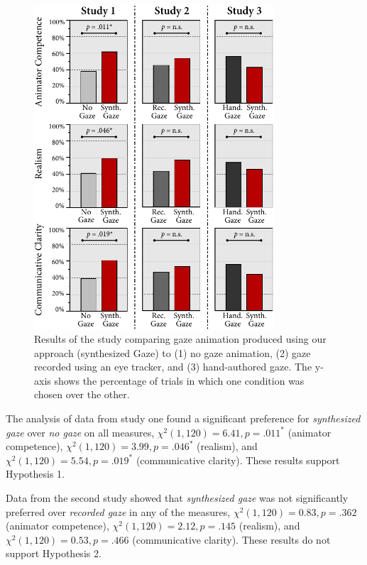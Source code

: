 \begin{figure}
\centering
\includegraphics[width=0.8\textwidth]{gazeauthoring/Figures/StudyResults.pdf}
\caption{Results of the study comparing gaze animation produced using our approach (synthesized Gaze) to (1) no gaze animation, (2) gaze recorded using an eye tracker, and (3) hand-authored gaze. The y-axis shows the percentage of trials in which one condition was chosen over the other.}
\end{figure}

The analysis of data from study one found a significant preference for \emph{synthesized gaze} over \emph{no gaze} on all measures, $\chi^2(1, 120) = 6.41, p = .011^*$ (animator competence), $\chi^2(1, 120) = 3.99, p = .046^*$ (realism), and $\chi^2(1, 120) = 5.54, p = .019^*$ (communicative clarity). These results support Hypothesis 1.

Data from the second study showed that \emph{synthesized gaze} was not significantly preferred over \emph{recorded gaze} in any of the measures, $\chi^2(1, 120) = 0.83, p = .362$ (animator competence), $\chi^2(1, 120) = 2.12, p = .145$ (realism), and $\chi^2(1, 120) = 0.53, p = .466$ (communicative clarity). These results do not support Hypothesis 2.

